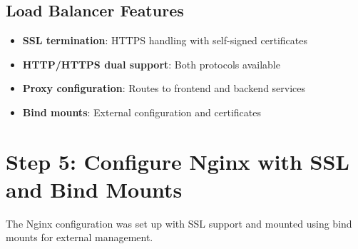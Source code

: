 \documentclass[12pt,a4paper]{article}
\begin{document}
\subsection{Load Balancer Features}
\begin{itemize}
    \item \textbf{SSL termination}: HTTPS handling with self-signed certificates
    \item \textbf{HTTP/HTTPS dual support}: Both protocols available
    \item \textbf{Proxy configuration}: Routes to frontend and backend services
    \item \textbf{Bind mounts}: External configuration and certificates
\end{itemize}

\newpage

\section{Step 5: Configure Nginx with SSL and Bind Mounts}

The Nginx configuration was set up with SSL support and mounted using bind mounts for external management.
\end{document}
